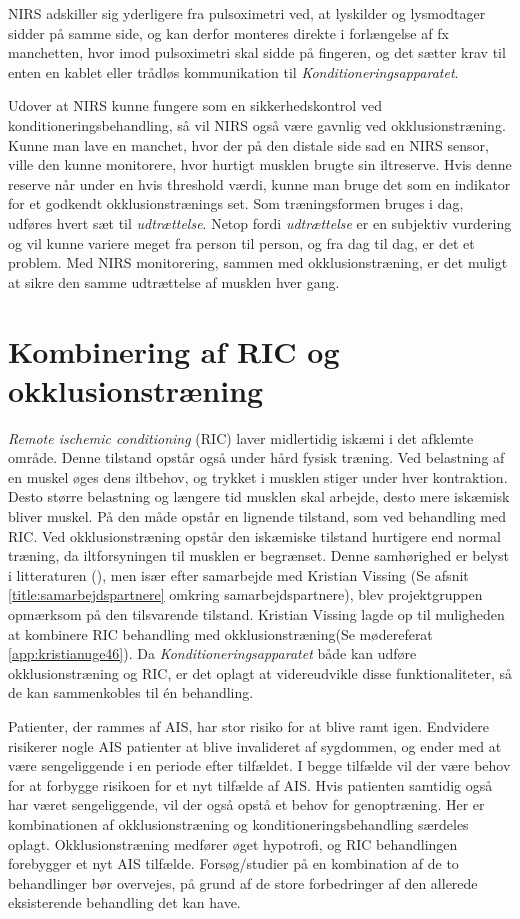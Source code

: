 NIRS adskiller sig yderligere fra pulsoximetri ved, at lyskilder og lysmodtager sidder på samme side, og kan derfor monteres direkte i forlængelse af fx manchetten, hvor imod pulsoximetri skal sidde på fingeren, og det sætter krav til enten en kablet eller trådløs kommunikation til \textit{Konditioneringsapparatet}. 

Udover at NIRS kunne fungere som en sikkerhedskontrol ved konditioneringsbehandling, så vil NIRS også være gavnlig ved okklusionstræning. Kunne man lave en manchet, hvor der på den distale side sad en NIRS sensor, ville den kunne monitorere, hvor hurtigt musklen brugte sin iltreserve. Hvis denne reserve når under en hvis threshold værdi, kunne man bruge det som en indikator for et godkendt okklusionstrænings set. Som træningsformen bruges i dag, udføres hvert sæt til \textit{udtrættelse}. Netop fordi \textit{udtrættelse} er en subjektiv vurdering og vil kunne variere meget fra person til person, og fra dag til dag, er det et problem. Med NIRS monitorering, sammen med okklusionstræning, er det muligt at sikre den samme udtrættelse af musklen hver gang. 

\section{Kombinering af RIC og okklusionstræning} \label{title:kombRICogOkkl}
\textit{Remote ischemic conditioning} (RIC) laver midlertidig iskæmi i det afklemte område. Denne tilstand opstår også under hård fysisk træning. Ved belastning af en muskel øges dens iltbehov, og trykket i musklen stiger under hver kontraktion. Desto større belastning og længere tid musklen skal arbejde, desto mere iskæmisk bliver muskel. På den måde opstår en lignende tilstand, som ved behandling med RIC. Ved okklusionstræning opstår den iskæmiske tilstand hurtigere end normal træning, da iltforsyningen til musklen er begrænset. Denne samhørighed er belyst i litteraturen (\cite{RefWorks:3}), men især efter samarbejde med Kristian Vissing (Se afsnit \ref{title:samarbejdspartnere} omkring samarbejdspartnere), blev projektgruppen opmærksom på den tilsvarende tilstand. Kristian Vissing lagde op til muligheden at kombinere RIC behandling med okklusionstræning(Se mødereferat \ref{app:kristianuge46}). Da \textit{Konditioneringsapparatet} både kan udføre okklusionstræning og RIC, er det oplagt at videreudvikle disse funktionaliteter, så de kan sammenkobles til én behandling. 

Patienter, der rammes af AIS, har stor risiko for at blive ramt igen. Endvidere risikerer nogle AIS patienter at blive invalideret af sygdommen, og ender med at være sengeliggende i en periode efter tilfældet. I begge tilfælde vil der være behov for at forbygge risikoen for et nyt tilfælde af AIS. Hvis patienten samtidig også har været sengeliggende, vil der også opstå et behov for genoptræning. Her er kombinationen af okklusionstræning og konditioneringsbehandling særdeles oplagt. Okklusionstræning medfører øget hypotrofi, og RIC behandlingen forebygger et nyt AIS tilfælde. Forsøg/studier på en kombination af de to behandlinger bør overvejes, på grund af de store forbedringer af den allerede eksisterende behandling det kan have. 


